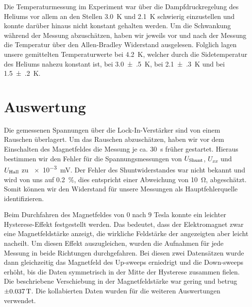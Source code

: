 \documentclass[paper=a4,fontsize=10pt,DIV=18,twocolumn,parskip=half]{scrartcl}
\numberwithin{equation}{section}    %
\newcommand{\kor}[1]{{\color{darkgreen}#1}}
\begin{document}
Die Temperaturmessung im Experiment war über die Dampfdruckregelung des Heliums vor allem an den Stellen \SI{3.0}{\kelvin} und \SI{2.1}{\kelvin} schwierig einzustellen und konnte darüber hinaus nicht konstant gehalten werden. Um die Schwankung während der Messung abzuschätzen, haben wir jeweils vor und nach der Messung die Temperatur über den Allen-Bradley Widerstand ausgelesen. Folglich lagen unsere gemittelten Temperaturwerte bei \SI{4.2}{\kelvin}, welcher durch die Sidetemperatur des Heliums nahezu konstant ist, bei \SI{3.0(5)}{\kelvin}, bei \SI{2.1(3)}{\kelvin} und bei \SI{1.5(2)}{\kelvin}. 


%
\section{Auswertung}
\label{Auswertung}
%



Die gemessenen Spannungen über die Lock-In-Verstärker sind von einem Rauschen überlagert. Um das Rauschen abzuschätzen, haben wir vor dem Einschalten des Magnetfeldes die Messung je ca. \SI{30}{\second} früher gestartet. Hieraus bestimmen wir den Fehler für die Spannungsmessungen von $U_{\rm Shunt}$, $U_{xx}$ und $U_{\rm Hall}$ zu \SI{e-3}{\milli\volt}. Der Fehler des Shuntwiderstandes war nicht bekannt und wird von uns auf \kor{\SI{0.2}{\percent}, dies entspricht einer Abweichung von \SI{10}{\ohm},} abgeschätzt. Somit können wir den Widerstand für unsere Messungen als Hauptfehlerquelle identifizieren.

Beim Durchfahren des Magnetfeldes von $0$ nach $9$ Tesla konnte ein leichter Hysterese-Effekt festgestellt werden. Das bedeutet, dass der Elektromagnet zwar eine Magnetfeldstärke anzeigt, die wirkliche Feldstärke der angezeigten aber leicht nacheilt. Um diesen Effekt auszugleichen, wurden die Aufnahmen für jede Messung in beide 
Richtungen durchgefahren. Bei diesen zwei Datensätzen wurde dann gleichzeitig das Magnetfeld des Up-sweeps erniedrigt und die Down-sweeps erhöht, bis die Daten symmetrisch in der Mitte der Hysterese zusammen fielen.
Die beschriebene Verschiebung in der Magnetfeldstärke war gering und betrug $\SI{\pm0.037}{\tesla}$. Die kollabierten Daten wurden für die weiteren Auswertungen verwendet.
\end{document}
